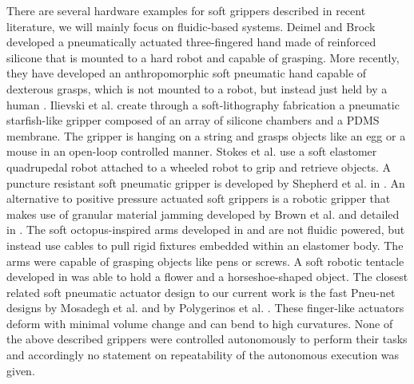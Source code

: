 There are several hardware examples for soft grippers described in recent literature, we will mainly focus on fluidic-based systems.
Deimel and Brock \cite{deimel2013compliant} developed a pneumatically actuated three-fingered hand made of reinforced silicone that is mounted to a hard robot and capable of grasping.
More recently, they have developed an anthropomorphic soft pneumatic hand capable of dexterous grasps, which is not mounted to a robot, but instead just held by a human \cite{deimel2014novel}. 
Ilievski et al. \cite{ilievski2011soft} create through a soft-lithography fabrication a pneumatic starfish-like gripper composed of an array of silicone chambers and a PDMS membrane. 
The gripper is hanging on a string and grasps objects like an egg or a mouse in an open-loop controlled manner. 
Stokes et al. \cite{Stokes2014hybrid} use a soft elastomer quadrupedal robot attached to a wheeled robot to grip and retrieve objects. 
A puncture resistant soft pneumatic gripper is developed by Shepherd et al. in \cite{shepherd2013soft}. 
An alternative to positive pressure actuated soft grippers is a robotic gripper that makes use of granular material jamming developed by Brown et al. and detailed in \cite{brown2010universal}.
The soft octopus-inspired arms developed in \cite{calisti2010study} and \cite{calisti2011octopus} are not fluidic powered, but instead use cables to pull rigid fixtures embedded within an elastomer body. 
The arms were capable of grasping objects like pens or screws.
A soft robotic tentacle developed in \cite{martinez2013robotic} was able to hold a flower and a horseshoe-shaped object.
The closest related soft pneumatic actuator design to our current work is the fast Pneu-net designs by Mosadegh et al. \cite{mosadegh2014pneumatic} and by Polygerinos et al. \cite{polygerinos2013towards}.
These finger-like actuators deform with minimal volume change and can bend to high curvatures.
None of the above described grippers were controlled autonomously to perform their tasks and accordingly no statement on repeatability of the autonomous execution was given. 

